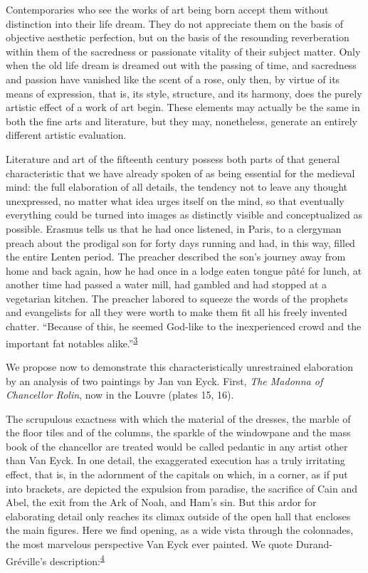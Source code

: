 Contemporaries who see the works of art being born accept them without
distinction into their life dream. They do not appreciate them on the
basis of objective aesthetic perfection, but on the basis of the
resounding reverberation within them of the sacredness or passionate
vitality of their subject matter. Only when the old life dream is
dreamed out with the passing of time, and sacredness and passion have
vanished like the scent of a rose, only then, by virtue of its means of
expression, that is, its style, structure, and its harmony, does the
purely artistic effect of a work of art begin. These elements may
actually be the same in both the fine arts and literature, but they may,
nonetheless, generate an entirely different artistic evaluation.

Literature and art of the fifteenth century possess both parts of that
general characteristic that we have already spoken of as being essential
for the medieval mind: the full elaboration of all details, the tendency
not to leave any thought unexpressed, no matter what idea urges itself
on the mind, so that eventually everything could be turned into images
as distinctly visible and conceptualized as possible. Erasmus tells us
that he had once listened, in Paris, to a clergyman preach about the
prodigal son for forty days running and had, in this way, filled the
entire Lenten period. The preacher described the son's journey away from
home and back again, how he had once in a lodge eaten tongue pâté for
lunch, at another time had passed a water mill, had gambled and had
stopped at a vegetarian kitchen. The preacher labored to squeeze the
words of the prophets and evangelists for all they were worth to make
them fit all his freely invented chatter. ``Because of this, he seemed
God-like to the inexperienced crowd and the important fat notables
alike.''\textsuperscript{\protect\hypertarget{21_Chapter_Thirteen__IMAGE_AND_WORD.xhtmlux5cux23id_302}{\protect\hyperlink{23_NOTES.xhtmlux5cux23id_303}{3}}}

We propose now to demonstrate this characteristically unrestrained
elaboration by an analysis of two paintings by Jan van
\protect\hypertarget{21_Chapter_Thirteen__IMAGE_AND_WORD.xhtmlux5cux23page_334}{}{}Eyck.
First, \emph{The Madonna of Chancellor Rolin}, now in the Louvre (plates
15, 16).

The scrupulous exactness with which the material of the dresses, the
marble of the floor tiles and of the columns, the sparkle of the
windowpane and the mass book of the chancellor are treated would be
called pedantic in any artist other than Van Eyck. In one detail, the
exaggerated execution has a truly irritating effect, that is, in the
adornment of the capitals on which, in a corner, as if put into
brackets, are depicted the expulsion from paradise, the sacrifice of
Cain and Abel, the exit from the Ark of Noah, and Ham's sin. But this
ardor for elaborating detail only reaches its climax outside of the open
hall that encloses the main figures. Here we find opening, as a wide
vista through the colonnades, the most marvelous perspective Van Eyck
ever painted. We quote Durand-Gréville's
description:\textsuperscript{\protect\hypertarget{21_Chapter_Thirteen__IMAGE_AND_WORD.xhtmlux5cux23id_300}{\protect\hyperlink{23_NOTES.xhtmlux5cux23id_301}{4}}}

